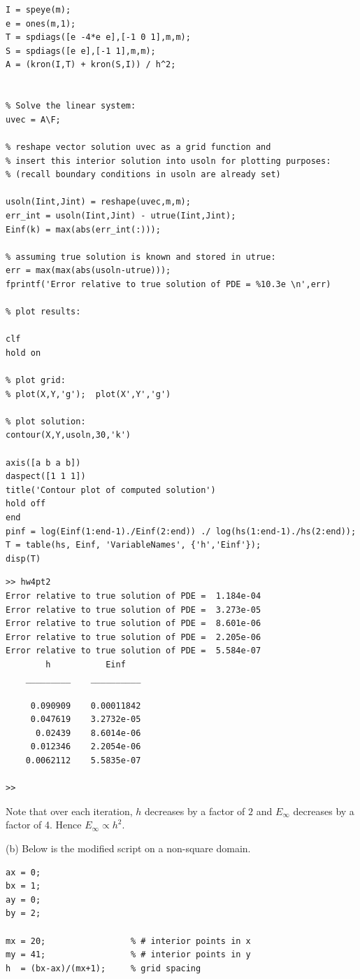 \documentclass[11pt,twoside,openany]{memoir}
\begin{document}
\begin{solution}
\begin{lstlisting}[style=MatlabEditorGrey]
% form matrix A:
I = speye(m);
e = ones(m,1);
T = spdiags([e -4*e e],[-1 0 1],m,m);
S = spdiags([e e],[-1 1],m,m);
A = (kron(I,T) + kron(S,I)) / h^2;


% Solve the linear system:
uvec = A\F;  

% reshape vector solution uvec as a grid function and 
% insert this interior solution into usoln for plotting purposes:
% (recall boundary conditions in usoln are already set) 

usoln(Iint,Jint) = reshape(uvec,m,m);
err_int = usoln(Iint,Jint) - utrue(Iint,Jint);
Einf(k) = max(abs(err_int(:)));

% assuming true solution is known and stored in utrue:
err = max(max(abs(usoln-utrue)));   
fprintf('Error relative to true solution of PDE = %10.3e \n',err)

% plot results:

clf
hold on

% plot grid:
% plot(X,Y,'g');  plot(X',Y','g')

% plot solution:
contour(X,Y,usoln,30,'k')

axis([a b a b])
daspect([1 1 1])
title('Contour plot of computed solution')
hold off
end
pinf = log(Einf(1:end-1)./Einf(2:end)) ./ log(hs(1:end-1)./hs(2:end));
T = table(hs, Einf, 'VariableNames', {'h','Einf'});
disp(T)
\end{lstlisting}
\newpage
\begin{lstlisting}[style=Matlab-console]
 >> hw4pt2
Error relative to true solution of PDE =  1.184e-04 
Error relative to true solution of PDE =  3.273e-05 
Error relative to true solution of PDE =  8.601e-06 
Error relative to true solution of PDE =  2.205e-06 
Error relative to true solution of PDE =  5.584e-07 
        h           Einf   
    _________    __________

     0.090909    0.00011842
     0.047619    3.2732e-05
      0.02439    8.6014e-06
     0.012346    2.2054e-06
    0.0062112    5.5835e-07

>>    
\end{lstlisting}
Note that over each iteration, $h$ decreases by a factor of $2$ and $E_\infty$ decreases by a factor of 4. Hence $E_\infty \propto h^2$.

(b) Below is the modified script on a non-square domain.
\begin{lstlisting}[style=MatlabEditorGrey]
ax = 0; 
bx = 1; 
ay = 0;
by = 2;

mx = 20;                 % # interior points in x
my = 41;                 % # interior points in y 
h  = (bx-ax)/(mx+1);     % grid spacing 


\end{lstlisting}
\end{solution}
\end{document}
